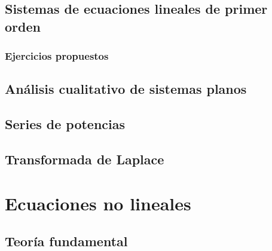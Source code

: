 \documentclass[a4paper, 10pt, openany]{book}
\begin{document}
\chapter{Sistemas de ecuaciones lineales de primer orden}\label{CHAP:SISTEMAS}

\newpage
\section{Ejercicios propuestos}


\chapter{Análisis cualitativo de sistemas planos}\label{CHAP:CUALITATIVO}


\chapter{Series de potencias}\label{CHAP:SERIES}


\chapter{Transformada de Laplace}\label{CHAP:LAPLACE}


\part{Ecuaciones no lineales}

\chapter{Teoría fundamental}\label{CHAP:TEORIA_FUNDAMENTAL}




% 

% 

% 

\backmatter{}

\listoffigures




\nocite{*}
\end{document}
